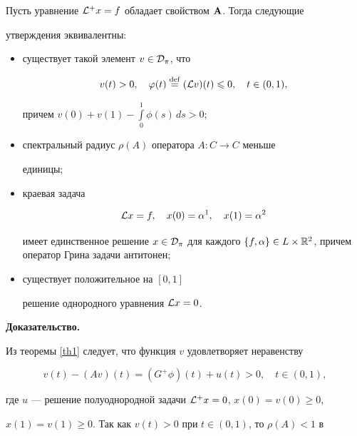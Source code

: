 \begin{thm}


Пусть уравнение ${\cal L}^+x=f$ обладает свойством $\bold A$. Тогда следующие


утверждения эквивалентны$:$


\begin{itemize}


\item[а)] существует такой элемент $v\in{\cal D}_\pi$, что


$$


v(t)>0,\quad \phi(t)\df(\L v)(t)\le0,\quad t\in(0,1),


$$


причем $v(0)+v(1)-\int\limits_0^1\phi(s)\,ds>0;$


\item[б)] спектральный радиус $\rho(A)$ оператора $A:C\to C$ меньше


единицы$;$


\item[в)] краевая задача


\begin{equation}


\label{5}


\L x=f,\quad x(0)=\a^1,\quad x(1)=\a^2


\end{equation}


имеет единственное решение $x\in\Dp$ для каждого $\{f,\a\}\in


L\times\R^2$, причем оператор Грина задачи антитонен$;$


\item[г)] существует положительное на $[0,1]$


решение однородного уравнения ${\cal L} x=0$.


\end{itemize}


\end{thm}





{\bf Доказательство.}


Из теоремы \ref{th1} следует, что функция $v$ удовлетворяет неравенству


$$


v(t)-(Av)(t)=(G^+\phi)(t)+u(t)>0,\quad t\in(0,1),


$$


где $u$ --- решение полуоднородной задачи ${\cal L}^+x=0$, $x(0)=v(0)\ge0$,


$x(1)=v(1)\ge0$. Так как $v(t)>0$ при $t\in(0,1)$, то $\rho(A)<1$ в


